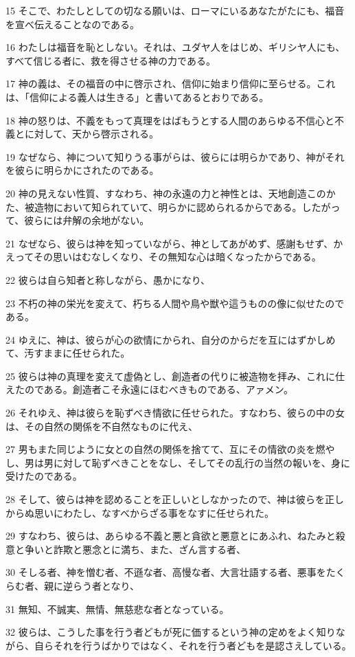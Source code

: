 \par 15 そこで、わたしとしての切なる願いは、ローマにいるあなたがたにも、福音を宣べ伝えることなのである。
\par 16 わたしは福音を恥としない。それは、ユダヤ人をはじめ、ギリシヤ人にも、すべて信じる者に、救を得させる神の力である。
\par 17 神の義は、その福音の中に啓示され、信仰に始まり信仰に至らせる。これは、「信仰による義人は生きる」と書いてあるとおりである。
\par 18 神の怒りは、不義をもって真理をはばもうとする人間のあらゆる不信心と不義とに対して、天から啓示される。
\par 19 なぜなら、神について知りうる事がらは、彼らには明らかであり、神がそれを彼らに明らかにされたのである。
\par 20 神の見えない性質、すなわち、神の永遠の力と神性とは、天地創造このかた、被造物において知られていて、明らかに認められるからである。したがって、彼らには弁解の余地がない。
\par 21 なぜなら、彼らは神を知っていながら、神としてあがめず、感謝もせず、かえってその思いはむなしくなり、その無知な心は暗くなったからである。
\par 22 彼らは自ら知者と称しながら、愚かになり、
\par 23 不朽の神の栄光を変えて、朽ちる人間や鳥や獣や這うものの像に似せたのである。
\par 24 ゆえに、神は、彼らが心の欲情にかられ、自分のからだを互にはずかしめて、汚すままに任せられた。
\par 25 彼らは神の真理を変えて虚偽とし、創造者の代りに被造物を拝み、これに仕えたのである。創造者こそ永遠にほむべきものである、アァメン。
\par 26 それゆえ、神は彼らを恥ずべき情欲に任せられた。すなわち、彼らの中の女は、その自然の関係を不自然なものに代え、
\par 27 男もまた同じように女との自然の関係を捨てて、互にその情欲の炎を燃やし、男は男に対して恥ずべきことをなし、そしてその乱行の当然の報いを、身に受けたのである。
\par 28 そして、彼らは神を認めることを正しいとしなかったので、神は彼らを正しからぬ思いにわたし、なすべからざる事をなすに任せられた。
\par 29 すなわち、彼らは、あらゆる不義と悪と貪欲と悪意とにあふれ、ねたみと殺意と争いと詐欺と悪念とに満ち、また、ざん言する者、
\par 30 そしる者、神を憎む者、不遜な者、高慢な者、大言壮語する者、悪事をたくらむ者、親に逆らう者となり、
\par 31 無知、不誠実、無情、無慈悲な者となっている。
\par 32 彼らは、こうした事を行う者どもが死に価するという神の定めをよく知りながら、自らそれを行うばかりではなく、それを行う者どもを是認さえしている。

